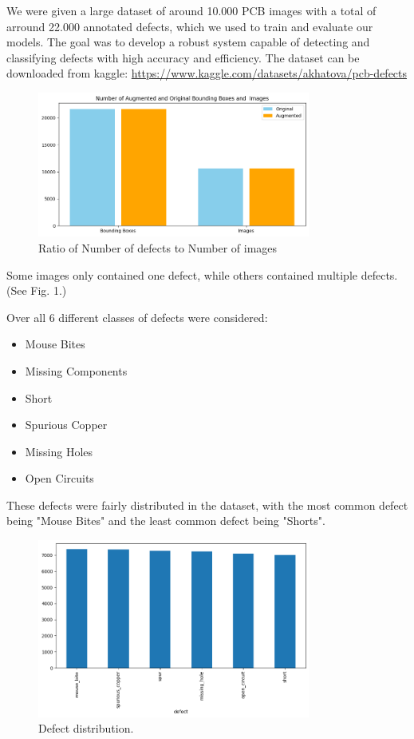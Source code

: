 \documentclass[12pt]{article}
\begin{document}
We were given a large dataset of around 10.000 PCB images with a total of arround 22.000 annotated defects, which we used to train and evaluate our models. The goal was to develop a robust system capable of detecting and classifying defects with high accuracy and efficiency.
The dataset can be downloaded from kaggle: \url{https://www.kaggle.com/datasets/akhatova/pcb-defects }

\begin{figure}[h]
    \centering
    \includegraphics[width=0.8\textwidth]{./graphics/2.png}
    \caption{Ratio of Number of defects to Number of images}
\end{figure}

Some images only contained one defect, while others contained multiple defects. (See Fig. 1.)

Over all 6 different classes of defects were considered:
\begin{itemize}
    \item Mouse Bites
    \item Missing Components
    \item Short
    \item Spurious Copper
    \item Missing Holes
    \item Open Circuits
\end{itemize}

These defects were fairly distributed in the dataset, with the most common defect being "Mouse Bites" and the least common defect being "Shorts".

\begin{figure}[h]
    \centering
    \includegraphics[width=0.8\textwidth]{./graphics/1.png}
    \caption{Defect distribution.}
\end{figure}
\end{document}
